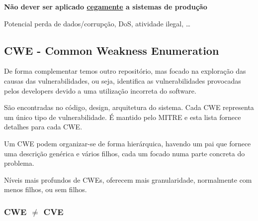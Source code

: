 \documentclass{article}
\begin{document}
  \vspace{2mm}

  \textbf{Não dever ser aplicado \uline{cegamente} a sistemas de produção}

  Potencial perda de dados/corrupção, DoS, atividade ilegal, \dots

  \subsection{CWE - Common Weakness Enumeration}

  De forma complementar temos outro repositório, mas focado na exploração das causas das
  vulnerabilidades, ou seja, identifica as vulnerabilidades provocadas pelos
  developers devido a
  uma utilização incorreta do
  software.

  \vspace{2mm}

  São encontradas no código, design, arquitetura do sistema. Cada CWE representa
  um único tipo de vulnerabilidade. É mantido pelo MITRE e esta lista
  fornece detalhes para cada CWE.
  
  \vspace{2mm}

  Um CWE podem organizar-se de forma hierárquica, havendo um pai que fornece uma descrição genérica e vários
filhos, cada um focado numa parte concreta do problema.

\vspace{2mm}

  Níveis mais profundos de CWEs, oferecem mais granularidade, normalmente
  com menos filhos, ou sem filhos.

  \begin{center}
    \subsubsection*{CWE $\ne$ CVE}
  \end{center}

  \pagebreak
\end{document}
